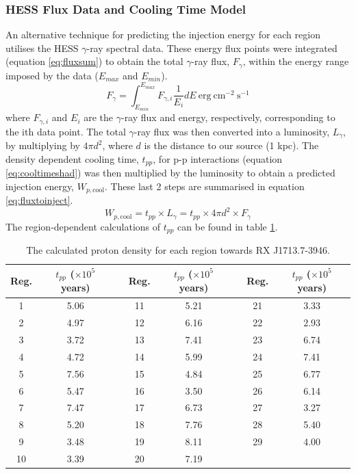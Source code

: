 \documentclass[12pt,a4paper]{article}
\begin{document}
\subsubsection{HESS Flux Data and Cooling Time Model}
An alternative technique for predicting the injection energy for each region utilises the HESS $\gamma$-ray spectral data. These energy flux points were integrated (equation \ref{eq:fluxsum}) to obtain the total $\gamma$-ray flux, $F_{\gamma}$, within the energy range imposed by the data ($E_{max}$ and $E_{min}$). 
\begin{equation}\label{eq:fluxsum}
F_\gamma = \int_{E_{min}}^{E_{max}} F_{\gamma, i} \dfrac{1}{E_i} dE \ \mathrm{erg\ cm}^{-2} \ \mathrm{s}^{-1}
\end{equation}
where $F_{\gamma, i}$ and $E_i$ are the $\gamma$-ray flux and energy, respectively, corresponding to the ith data point. The total $\gamma$-ray flux was then converted into a luminosity, $L_\gamma$, by multiplying by $4 \pi d^2$, where $d$ is the distance to our source (1 kpc). The density dependent cooling time, $t_{pp}$, for p-p interactions (equation \ref{eq:cooltimeshad}) was then multiplied by the luminosity to obtain a predicted injection energy, $W_{p,\mathrm{cool}}$. These last 2 steps are summarised in equation \ref{eq:fluxtoinject}.
\begin{equation}\label{eq:fluxtoinject}
W_{p,\mathrm{cool}} = t_{pp} \times L_\gamma = t_{pp} \times 4 \pi d^2 \times F_\gamma 
\end{equation}
The region-dependent calculations of $t_{pp}$ can be found in table \ref{tab:ppcooltimes}.
\begin{table}[H] 
	\begin{center}
		\begin{tabular}{cccccccc}
			\toprule
			Reg. & $t_{pp}$ ($\times 10^5$ years) && Reg. & $t_{pp}$ ($\times 10^5$ years) && Reg. & $t_{pp}$ ($\times 10^5$ years)\\ 
			\hline 
			1& 5.06 && 11 & 5.21  && 21 & 3.33 \\ 
			2& 4.97 && 12 & 6.16  && 22 & 2.93 \\ 
			3& 3.72 && 13 & 7.41  && 23 & 6.74 \\ 
			4& 4.72 && 14 & 5.99  && 24 & 7.41 \\ 
			5& 7.56 && 15 & 4.84 && 25 & 6.77  \\ 
			6& 5.47 && 16 & 3.50  && 26 & 6.14 \\ 
			7& 7.47 && 17 & 6.73  && 27 & 3.27 \\ 
			8& 5.20 && 18 & 7.76  && 28 & 5.40 \\ 
			9& 3.48 && 19 & 8.11  && 29 & 4.00 \\ 
			10& 3.39 && 20 & 7.19  && & \\ 
			\bottomrule
		\end{tabular} 
	\end{center}
	\caption{The calculated proton density for each region towards RX J1713.7-3946.}
	\label{tab:ppcooltimes}
\end{table}
\end{document}
